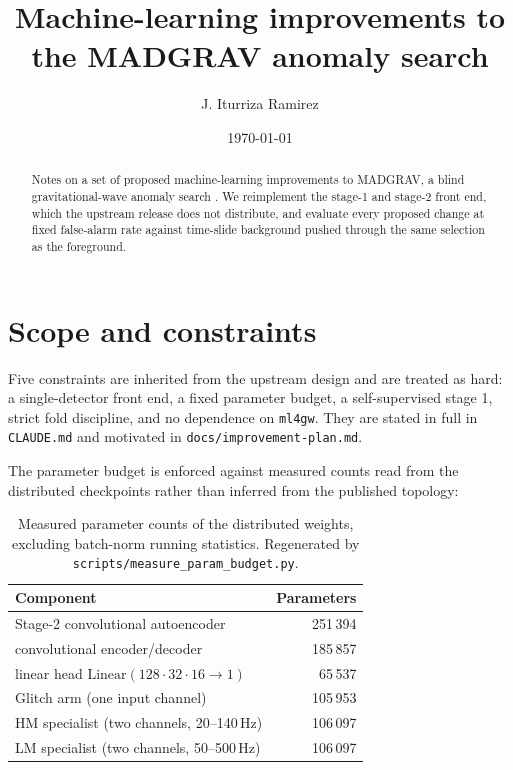 \documentclass[11pt]{article}
\title{Machine-learning improvements to the MADGRAV anomaly search}
\author{J. Iturriza Ramirez}
\date{\today}
\begin{document}
\maketitle

\begin{abstract}
Notes on a set of proposed machine-learning improvements to MADGRAV, a blind
gravitational-wave anomaly search \citep{Inguglia2026}. We reimplement the stage-1 and
stage-2 front end, which the upstream release does not distribute, and evaluate every
proposed change at fixed false-alarm rate against time-slide background pushed through
the same selection as the foreground.
\end{abstract}

\section{Scope and constraints}

Five constraints are inherited from the upstream design and are treated as hard: a
single-detector front end, a fixed parameter budget, a self-supervised stage 1, strict
fold discipline, and no dependence on \texttt{ml4gw}. They are stated in full in
\texttt{CLAUDE.md} and motivated in \texttt{docs/improvement-plan.md}.

The parameter budget is enforced against measured counts read from the distributed
checkpoints rather than inferred from the published topology:

\begin{table}[h]
\centering
\begin{tabular}{lr}
\toprule
Component & Parameters \\
\midrule
Stage-2 convolutional autoencoder & 251\,394 \\
\quad convolutional encoder/decoder & 185\,857 \\
\quad linear head $\mathrm{Linear}(128{\cdot}32{\cdot}16 \to 1)$ & 65\,537 \\
Glitch arm (one input channel) & 105\,953 \\
HM specialist (two channels, 20--140\,Hz) & 106\,097 \\
LM specialist (two channels, 50--500\,Hz) & 106\,097 \\
\bottomrule
\end{tabular}
\caption{Measured parameter counts of the distributed weights, excluding batch-norm
running statistics. Regenerated by \texttt{scripts/measure\_param\_budget.py}.}
\end{table}
\end{document}

